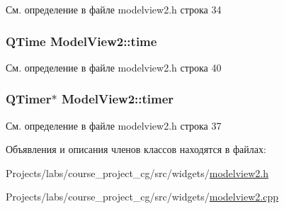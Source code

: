 См. определение в файле modelview2.\+h строка 34

\subsubsection[{\texorpdfstring{time}{time}}]{\setlength{\rightskip}{0pt plus 5cm}Q\+Time Model\+View2\+::time\hspace{0.3cm}{\ttfamily [private]}}\hypertarget{class_model_view2_a74993d9390f59b659289765f886e3bfd}{}\label{class_model_view2_a74993d9390f59b659289765f886e3bfd}


См. определение в файле modelview2.\+h строка 40

\subsubsection[{\texorpdfstring{timer}{timer}}]{\setlength{\rightskip}{0pt plus 5cm}Q\+Timer$\ast$ Model\+View2\+::timer\hspace{0.3cm}{\ttfamily [private]}}\hypertarget{class_model_view2_ab6f5ba3f864092610433f644bdd09540}{}\label{class_model_view2_ab6f5ba3f864092610433f644bdd09540}


См. определение в файле modelview2.\+h строка 37



Объявления и описания членов классов находятся в файлах\+:\begin{DoxyCompactItemize}
\item 
Projects/labs/course\+\_\+project\+\_\+cg/src/widgets/\hyperlink{modelview2_8h}{modelview2.\+h}\item 
Projects/labs/course\+\_\+project\+\_\+cg/src/widgets/\hyperlink{modelview2_8cpp}{modelview2.\+cpp}\end{DoxyCompactItemize}
